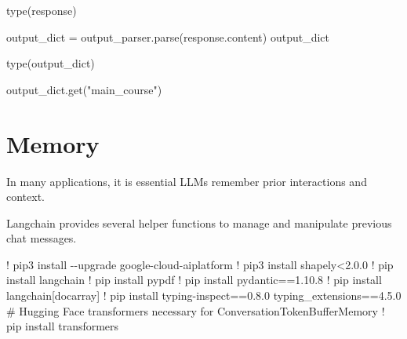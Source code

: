\documentclass[
  letterpaper,
  DIV=11,
  numbers=noendperiod]{scrreprt}
\newenvironment{Shaded}{\begin{snugshade}}{\end{snugshade}}
\newcommand{\BuiltInTok}[1]{\textcolor[rgb]{0.00,0.23,0.31}{#1}}
\newcommand{\CommentTok}[1]{\textcolor[rgb]{0.37,0.37,0.37}{#1}}
\newcommand{\FloatTok}[1]{\textcolor[rgb]{0.68,0.00,0.00}{#1}}
\newcommand{\NormalTok}[1]{\textcolor[rgb]{0.00,0.23,0.31}{#1}}
\newcommand{\OperatorTok}[1]{\textcolor[rgb]{0.37,0.37,0.37}{#1}}
\newcommand{\StringTok}[1]{\textcolor[rgb]{0.13,0.47,0.30}{#1}}
\begin{document}
\begin{Shaded}
\begin{Highlighting}[]
\BuiltInTok{type}\NormalTok{(response)}
\end{Highlighting}
\end{Shaded}

\begin{Shaded}
\begin{Highlighting}[]
\NormalTok{output\_dict }\OperatorTok{=}\NormalTok{ output\_parser.parse(response.content)}
\NormalTok{output\_dict}
\end{Highlighting}
\end{Shaded}

\begin{Shaded}
\begin{Highlighting}[]
\BuiltInTok{type}\NormalTok{(output\_dict)}
\end{Highlighting}
\end{Shaded}

\begin{Shaded}
\begin{Highlighting}[]
\NormalTok{output\_dict.get(}\StringTok{"main\_course"}\NormalTok{)}
\end{Highlighting}
\end{Shaded}

\hypertarget{memory}{%
\chapter{Memory}\label{memory}}

In many applications, it is essential LLMs remember prior interactions
and context.

Langchain provides several helper functions to manage and manipulate
previous chat messages.

\begin{Shaded}
\begin{Highlighting}[]
\OperatorTok{!}\NormalTok{ pip3 install }\OperatorTok{{-}{-}}\NormalTok{upgrade google}\OperatorTok{{-}}\NormalTok{cloud}\OperatorTok{{-}}\NormalTok{aiplatform}
\OperatorTok{!}\NormalTok{ pip3 install shapely}\OperatorTok{\textless{}}\FloatTok{2.0.0}
\OperatorTok{!}\NormalTok{ pip install langchain}
\OperatorTok{!}\NormalTok{ pip install pypdf}
\OperatorTok{!}\NormalTok{ pip install pydantic}\OperatorTok{==}\FloatTok{1.10.8}
\OperatorTok{!}\NormalTok{ pip install langchain[docarray]}
\OperatorTok{!}\NormalTok{ pip install typing}\OperatorTok{{-}}\NormalTok{inspect}\OperatorTok{==}\FloatTok{0.8.0}\NormalTok{ typing\_extensions}\OperatorTok{==}\FloatTok{4.5.0}
\CommentTok{\# Hugging Face transformers necessary for ConversationTokenBufferMemory}
\OperatorTok{!}\NormalTok{ pip install transformers}
\end{Highlighting}
\end{Shaded}
\end{document}
